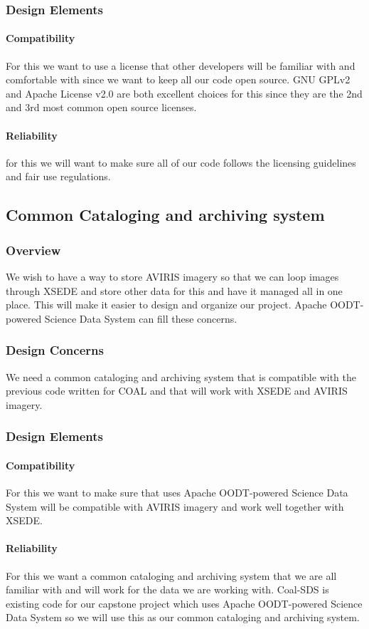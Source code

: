 \documentclass[10pt,draftclsnofoot,onecolumn,journal,compsoc]{IEEEtran}
\begin{document}
\subsubsection{Design Elements}
\paragraph{Compatibility}
For this we want to use a license that other developers will be familiar with and comfortable with since we want to keep all our code open source. GNU GPLv2 and Apache License v2.0 are both excellent choices for this since they are the 2nd and 3rd most common open source licenses.
\paragraph{Reliability}
for this we will want to make sure all of our code follows the licensing guidelines and fair use regulations.

\subsection{Common Cataloging and archiving system}
\subsubsection{Overview}
\noindent We wish to have a way to store AVIRIS imagery so that we can loop images through XSEDE and store other data for this and have it managed all in one place. This will make it easier to design and organize our project. Apache OODT-powered Science Data System can fill these concerns.
\subsubsection{Design Concerns}
We need a common cataloging and archiving system that is compatible with the previous code written for COAL and that will work with XSEDE and AVIRIS imagery.
\subsubsection{Design Elements}
\paragraph{Compatibility}
\noindent For this we want to make sure that uses Apache OODT-powered Science Data System will be compatible with AVIRIS imagery and work well together with XSEDE.
\paragraph{Reliability}
\noindent For this we want a common cataloging and archiving system that we are all familiar with and will work for the data we are working with. Coal-SDS is existing code for our capstone project which uses Apache OODT-powered Science Data System so we will use this as our common cataloging and archiving system.
\end{document}
